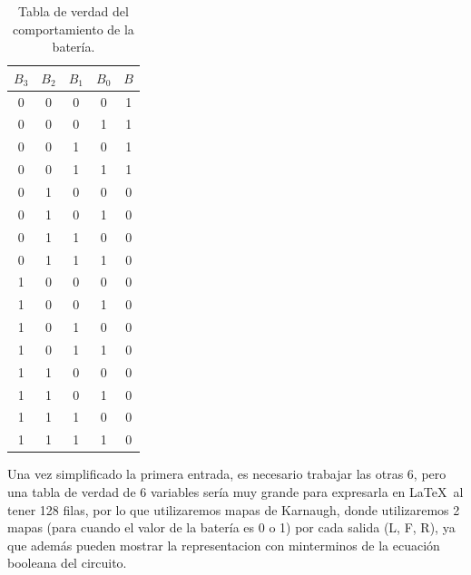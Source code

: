 \documentclass[a4paper]{article}
\begin{document}
\begin{table}[!htbp]
    \centering
    \begin{tabular}{cccc|c}
    $B_3$ & $B_2$ & $B_1$ & $B_0$ & $B$ \\ \hline
    0     & 0     & 0     & 0     & 1   \\
    0     & 0     & 0     & 1     & 1   \\
    0     & 0     & 1     & 0     & 1   \\
    0     & 0     & 1     & 1     & 1   \\
    0     & 1     & 0     & 0     & 0   \\
    0     & 1     & 0     & 1     & 0   \\
    0     & 1     & 1     & 0     & 0   \\
    0     & 1     & 1     & 1     & 0   \\
    1     & 0     & 0     & 0     & 0   \\
    1     & 0     & 0     & 1     & 0   \\
    1     & 0     & 1     & 0     & 0   \\
    1     & 0     & 1     & 1     & 0   \\
    1     & 1     & 0     & 0     & 0   \\
    1     & 1     & 0     & 1     & 0   \\
    1     & 1     & 1     & 0     & 0   \\
    1     & 1     & 1     & 1     & 0  
    \end{tabular}
    \caption{Tabla de verdad del comportamiento de la batería.}
    \label{tab1}
\end{table}

Una vez simplificado la primera entrada, es necesario trabajar las otras 6, pero una tabla de verdad de 6 variables sería muy grande para expresarla en \LaTeX \  al tener 128 filas, por lo que utilizaremos mapas de Karnaugh, donde utilizaremos 2 mapas (para cuando el valor de la batería es 0 o 1) por cada salida (L, F, R), ya que además pueden mostrar la representacion con minterminos de la ecuación booleana del circuito.
\end{document}
